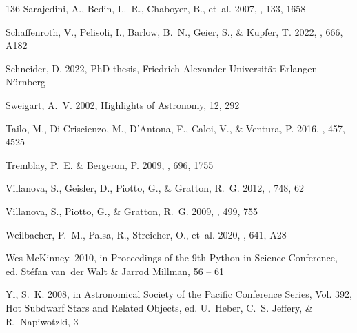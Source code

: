 \documentclass{aa}
\begin{document}
\begin{thebibliography}{136}
{Sarajedini}, A., {Bedin}, L.~R., {Chaboyer}, B., {et~al.} 2007, \aj, 133, 1658

{Schaffenroth}, V., {Pelisoli}, I., {Barlow}, B.~N., {Geier}, S., \& {Kupfer},
  T. 2022, \aap, 666, A182

{Schneider}, D. 2022, PhD thesis, Friedrich-Alexander-Universität
  Erlangen-Nürnberg

{Sweigart}, A.~V. 2002, Highlights of Astronomy, 12, 292

{Tailo}, M., {Di Criscienzo}, M., {D'Antona}, F., {Caloi}, V., \& {Ventura}, P.
  2016, \mnras, 457, 4525

{Tremblay}, P.~E. \& {Bergeron}, P. 2009, \apj, 696, 1755

{Villanova}, S., {Geisler}, D., {Piotto}, G., \& {Gratton}, R.~G. 2012, \apj,
  748, 62

{Villanova}, S., {Piotto}, G., \& {Gratton}, R.~G. 2009, \aap, 499, 755

{Weilbacher}, P.~M., {Palsa}, R., {Streicher}, O., {et~al.} 2020, \aap, 641,
  A28

{W}es {M}c{K}inney. 2010, in {P}roceedings of the 9th {P}ython in {S}cience
  {C}onference, ed. {S}t\'efan van~der {W}alt \& {J}arrod {M}illman, 56 -- 61

{Yi}, S.~K. 2008, in Astronomical Society of the Pacific Conference Series,
  Vol. 392, Hot Subdwarf Stars and Related Objects, ed. U.~{Heber}, C.~S.
  {Jeffery}, \& R.~{Napiwotzki}, 3

\end{thebibliography}
\end{document}

